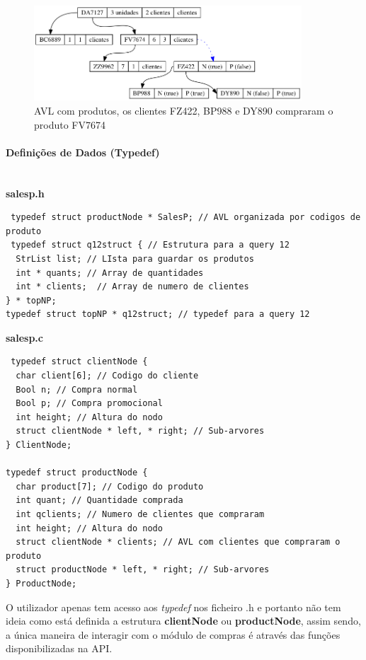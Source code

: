 \documentclass[10pt] {article}
\begin{document}
\begin{figure}[ht!]
\centering
\includegraphics[width=100mm]{avl_salesp.png}
\caption{AVL com produtos, os clientes FZ422, BP988 e DY890 compraram o produto FV7674}
\end{figure}
 
 \paragraph {Definições de Dados (Typedef)}\mbox{}\\
 \textbf{salesp.h}
 \begin{lstlisting}
 typedef struct productNode * SalesP; // AVL organizada por codigos de produto
 typedef struct q12struct { // Estrutura para a query 12
  StrList list; // LIsta para guardar os produtos
  int * quants; // Array de quantidades
  int * clients;  // Array de numero de clientes
} * topNP;
typedef struct topNP * q12struct; // typedef para a query 12

 \end{lstlisting}
 \textbf{salesp.c}
 \begin{lstlisting}
 typedef struct clientNode {
  char client[6]; // Codigo do cliente
  Bool n; // Compra normal
  Bool p; // Compra promocional
  int height; // Altura do nodo
  struct clientNode * left, * right; // Sub-arvores
} ClientNode;

typedef struct productNode {
  char product[7]; // Codigo do produto
  int quant; // Quantidade comprada
  int qclients; // Numero de clientes que compraram
  int height; // Altura do nodo
  struct clientNode * clients; // AVL com clientes que compraram o produto
  struct productNode * left, * right; // Sub-arvores
} ProductNode;
\end{lstlisting}

 \par O utilizador apenas tem acesso aos \emph{typedef} nos ficheiro .h e portanto não tem ideia como está
 definida a estrutura \textbf{clientNode} ou \textbf{productNode}, assim sendo, a única maneira de interagir com o 
 módulo de compras é através das funções disponibilizadas na API.
\end{document}
